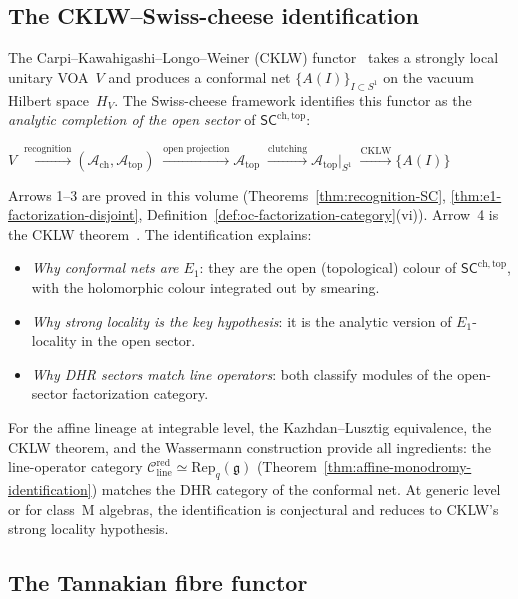 \documentclass[11pt]{article}
\newcommand{\cA}{\mathcal{A}}
\newcommand{\cC}{\mathcal{C}}
\newcommand{\fg}{\mathfrak{g}}
\newcommand{\SCchtop}{\mathsf{SC}^{\mathrm{ch,top}}}
\begin{document}
\subsection{The CKLW--Swiss-cheese identification}
\label{sec:cklw-sc-identification}

The Carpi--Kawahigashi--Longo--Weiner (CKLW) functor~\cite{CKLW18}
takes a strongly local unitary VOA~$V$ and produces a conformal
net $\{A(I)\}_{I \subset S^1}$ on the vacuum Hilbert space~$H_V$.
The Swiss-cheese framework identifies this functor as the
\emph{analytic completion of the open sector}
of $\SCchtop$:

\begin{center}
\small
$V \;\xrightarrow{\text{recognition}}
(\cA_{\mathrm{ch}}, \cA_{\mathrm{top}})
\;\xrightarrow{\text{open projection}}
\cA_{\mathrm{top}}
\;\xrightarrow{\text{clutching}}
\cA_{\mathrm{top}}|_{S^1}
\;\xrightarrow{\text{CKLW}}
\{A(I)\}$
\end{center}

\noindent Arrows 1--3 are proved in this volume
(Theorems~\ref{thm:recognition-SC},
\ref{thm:e1-factorization-disjoint},
Definition~\ref{def:oc-factorization-category}(vi)).
Arrow~4 is the CKLW theorem~\cite{CKLW18}.
The identification explains:
\begin{itemize}[nosep]
\item \emph{Why conformal nets are $E_1$}: they are the open
  (topological) colour of $\SCchtop$, with the holomorphic
  colour integrated out by smearing.
\item \emph{Why strong locality is the key hypothesis}: it is
  the analytic version of $E_1$-locality in the open sector.
\item \emph{Why DHR sectors match line operators}: both
  classify modules of the open-sector factorization category.
\end{itemize}
For the affine lineage at integrable level, the Kazhdan--Lusztig
equivalence, the CKLW theorem, and the Wassermann construction
provide all ingredients: the line-operator category
$\cC_{\mathrm{line}}^{\mathrm{red}} \simeq
\mathrm{Rep}_q(\fg)$ (Theorem~\ref{thm:affine-monodromy-identification})
matches the DHR category of the conformal net.  At generic level
or for class~M algebras, the identification is conjectural and
reduces to CKLW's strong locality hypothesis.

\subsection{The Tannakian fibre functor}
\label{sec:tannakian-fibre-functor}
\end{document}
